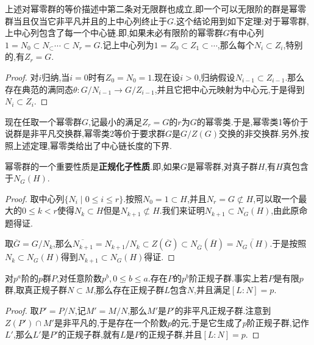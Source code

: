 上述对幂零群的等价描述中第二条对无限群也成立,即一个可以无限阶的群是幂零群当且仅当它非平凡并且的上中心列终止于$G$.这个结论用到如下定理:对于幂零群,上中心列包含了每一个中心链.即,如果未必有限阶的幂零群$G$有中心列$1=N_0\subset N_\subset\cdots\subset N_r=G$.记上中心列为$1=Z_0\subset Z_1\subset\cdots$,那么每个$N_i\subset Z_i$,特别的,有$Z_r=G$.
\begin{proof}
	
	对$i$归纳,当$i=0$时有$Z_0=N_0=1$.现在设$i>0$,归纳假设$N_{i-1}\subset Z_{i-1}$.那么存在典范的满同态$\theta:G/N_{i-1}\to G/Z_{i-1}$,并且它把中心元映射为中心元,于是得到$N_i\subset Z_i$.
\end{proof}

现在任取一个幂零群$G$,记最小的满足$Z_r=G$的$r$为$G$的幂零类.于是,幂零类1等价于说群是非平凡交换群,幂零类2等价于要求群$G$是$G/Z(G)$交换的非交换群.另外,按照上述定理,幂零类给出了中心链长度的下界.

幂零群的一个重要性质是\textbf{正规化子性质}.即,如果$G$是幂零群,对真子群$H$,有$H$真包含于$N_G(H)$.
\begin{proof}
	
	取中心列$\{N_i\mid 0\le i\le r\}$.按照$N_0=1\subset H$,并且$N_r=G\not\subset H$,可以取一个最大的$0\le k<r$使得$N_k\subset H$但是$N_{k+1}\not\subset H$.我们来证明$N_{k+1}\subset N_G(H)$,由此原命题得证.
	
	取$\overline{G}=G/N_k$,那么$\overline{N_{k+1}}=N_{k+1}/N_k\subset Z(\overline{G})\subset N_{\overline{G}}(\overline{H})=\overline{N_G(H)}$.于是按照$N_k\subset N_G(H)$得到$N_{k+1}\subset N_G(H)$得证.
\end{proof}

对$p^a$阶的$p$群$P$,对任意阶数$p^b,0\le b\le a$.存在$P$的$p^b$阶正规子群.事实上若$P$是有限$p$群,取真正规子群$N\subset M$,那么存在正规子群$L$包含$N$,并且满足$[L:N]=p$.
\begin{proof}
	
	取$P'=P/N$,记$M'=M/N$,那么$M'$是$P'$的非平凡正规子群.注意到$Z(P')\cap M'$是非平凡的,于是存在一个阶数$p$的元,于是它生成了$p$阶正规子群,记作$L'$,那么$L'$是$P'$的正规子群,就有$L$是$P$的正规子群,并且$[L:N]=p$.
\end{proof}

